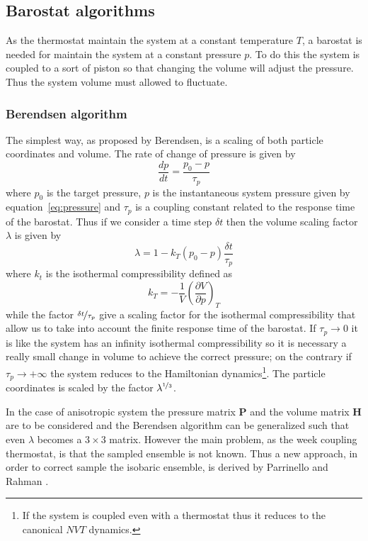 \subsection{Barostat algorithms} %
As the thermostat maintain the system at a constant temperature $T$, a barostat is needed for maintain the system at a constant pressure $p$. To do this the system is coupled to a sort of piston so that changing the volume will adjust the pressure. Thus the system volume must allowed to fluctuate. 

\subsubsection{Berendsen algorithm}
The simplest way, as proposed by Berendsen, is a scaling of both particle coordinates and volume. The rate of change of pressure is given by
\begin{equation*}
	\frac{dp}{dt} = \frac{p_0 - p}{\tau_p}
\end{equation*}
where $p_0$ is the target pressure, $p$ is the instantaneous system pressure given by equation~\eqref{eq:pressure} and $\tau_p$ is a coupling constant related to the response time of the barostat. Thus if we consider a time step $\delta t$ then the volume scaling factor $\lambda$ is given by
\begin{equation*}
	\lambda = 1- k_T (p_0 - p) \frac{\delta t}{\tau_p}
\end{equation*}
where $k_t$ is the isothermal compressibility defined as
\begin{equation*}
	k_T = -\frac{1}{V}\left ( \frac{\partial V}{\partial p}\right )_{T}
\end{equation*}
while the factor $\nicefrac{\delta t}{\tau_p}$ give a scaling factor for the isothermal compressibility that allow us to take into account the finite response time of the barostat. If $\tau_p \rightarrow 0$ it is like the system has an infinity isothermal compressibility so it is necessary a really small change in volume to achieve the correct pressure; on the contrary if $\tau_p \rightarrow +\infty$ the system reduces to the Hamiltonian dynamics\footnote{If the system is coupled even with a thermostat thus it reduces to the canonical $NVT$ dynamics.}. The particle coordinates is scaled by the factor $\lambda^{\nicefrac{1}{3}}$.  

In the case of anisotropic system the pressure matrix $\mathbold{P}$ and the volume matrix $\mathbold{H}$ are to be considered and the Berendsen algorithm can be generalized such that even $\lambda$ becomes a $3\times 3$ matrix. However the main problem, as the week coupling thermostat, is that the sampled ensemble is not known. Thus a new approach, in order to correct sample the isobaric ensemble, is derived by Parrinello and Rahman \cite{ParinelloBarostat}.  

